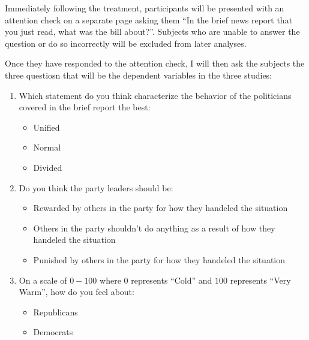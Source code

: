 \documentclass[12pt]{article}
\begin{document}
Immediately following the treatment, participants will be presented with an attention check on a separate page asking them ``In the brief news report that you just read, what was the bill about?''. Subjects who are unable to answer the question or do so incorrectly will be excluded from later analyses. 

Once they have responded to the attention check, I will then ask the subjects the three questiosn that will be the dependent variables in the three studies:
     \begin{enumerate}
          \item Which statement do you think characterize the behavior of the politicians covered in the brief report the best:
          \begin{itemize}
               \item Unified
               \item Normal
               \item Divided
          \end{itemize}
          \item Do you think the party leaders should be:
          \begin{itemize}
               \item Rewarded by others in the party for how they handeled the situation
               \item Others in the party shouldn't do anything as a result of how they handeled the situation
               \item Punished by others in the party for how they handeled the situation
          \end{itemize}
          \item On a scale of $0-100$ where $0$ represents ``Cold'' and $100$ represents ``Very Warm'', how do you feel about:
          \begin{itemize}
               \item Republicans
               \item Democrats
          \end{itemize}
     \end{enumerate}

\newpage


\end{document}
